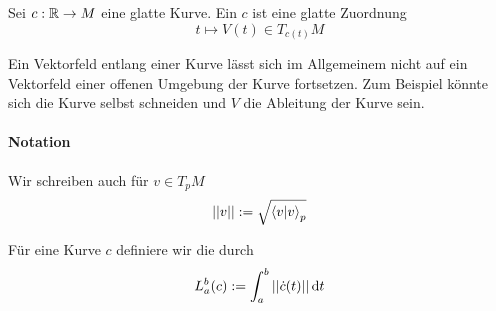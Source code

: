 \Def{}
Sei $c : \mathbb{R} \overset{}{\rightarrow} M$ eine glatte Kurve. Ein  $c$ ist eine glatte Zuordnung
\[ t \longmapsto V(t) \in T_{c(t)}M \]

\Bem{}
Ein Vektorfeld entlang einer Kurve lässt sich im Allgemeinem nicht auf ein Vektorfeld einer offenen Umgebung der Kurve fortsetzen. Zum Beispiel könnte sich die Kurve selbst schneiden und $V$ die Ableitung der Kurve sein.

\paragraph{Notation}
Wir schreiben auch für $v \in T_pM$
\[ \left|\left|v\right|\right| := \sqrt{ \left<v|v\right>_p } \]

\Def{}
Für eine Kurve $c$ definiere wir die  durch
\[ L^b_a(c) := \int_{a}^{b} \left|\left|\dot{c}(t)\right|\right| \text{d} t \]
